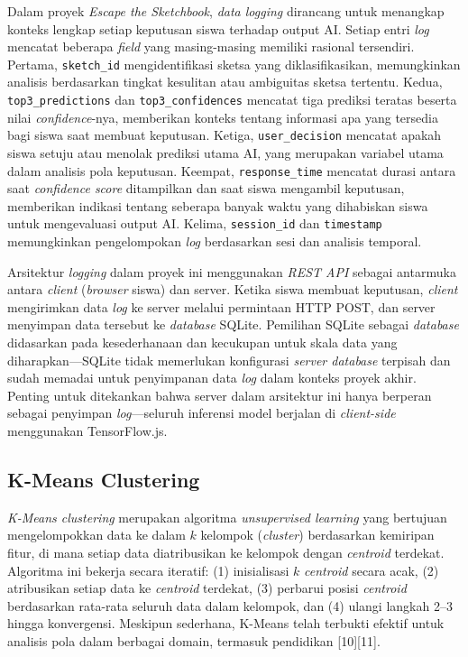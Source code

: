 \documentclass[10pt,twoside,openright]{report}
\begin{document}
Dalam proyek \textit{Escape the Sketchbook}, \textit{data logging} dirancang untuk menangkap konteks lengkap setiap keputusan siswa terhadap output AI. Setiap entri \textit{log} mencatat beberapa \textit{field} yang masing-masing memiliki rasional tersendiri. Pertama, \texttt{sketch\_id} mengidentifikasi sketsa yang diklasifikasikan, memungkinkan analisis berdasarkan tingkat kesulitan atau ambiguitas sketsa tertentu. Kedua, \texttt{top3\_predictions} dan \texttt{top3\_confidences} mencatat tiga prediksi teratas beserta nilai \textit{confidence}-nya, memberikan konteks tentang informasi apa yang tersedia bagi siswa saat membuat keputusan. Ketiga, \texttt{user\_decision} mencatat apakah siswa setuju atau menolak prediksi utama AI, yang merupakan variabel utama dalam analisis pola keputusan. Keempat, \texttt{response\_time} mencatat durasi antara saat \textit{confidence score} ditampilkan dan saat siswa mengambil keputusan, memberikan indikasi tentang seberapa banyak waktu yang dihabiskan siswa untuk mengevaluasi output AI. Kelima, \texttt{session\_id} dan \texttt{timestamp} memungkinkan pengelompokan \textit{log} berdasarkan sesi dan analisis temporal.

Arsitektur \textit{logging} dalam proyek ini menggunakan \textit{REST API} sebagai antarmuka antara \textit{client} (\textit{browser} siswa) dan server. Ketika siswa membuat keputusan, \textit{client} mengirimkan data \textit{log} ke server melalui permintaan HTTP POST, dan server menyimpan data tersebut ke \textit{database} SQLite. Pemilihan SQLite sebagai \textit{database} didasarkan pada kesederhanaan dan kecukupan untuk skala data yang diharapkan—SQLite tidak memerlukan konfigurasi \textit{server database} terpisah dan sudah memadai untuk penyimpanan data \textit{log} dalam konteks proyek akhir. Penting untuk ditekankan bahwa server dalam arsitektur ini hanya berperan sebagai penyimpan \textit{log}—seluruh inferensi model berjalan di \textit{client-side} menggunakan TensorFlow.js.

\subsection{K-Means Clustering}
\label{subsec:kmeans}

\textit{K-Means clustering} merupakan algoritma \textit{unsupervised learning} yang bertujuan mengelompokkan data ke dalam $k$ kelompok (\textit{cluster}) berdasarkan kemiripan fitur, di mana setiap data diatribusikan ke kelompok dengan \textit{centroid} terdekat. Algoritma ini bekerja secara iteratif: (1) inisialisasi $k$ \textit{centroid} secara acak, (2) atribusikan setiap data ke \textit{centroid} terdekat, (3) perbarui posisi \textit{centroid} berdasarkan rata-rata seluruh data dalam kelompok, dan (4) ulangi langkah 2--3 hingga konvergensi. Meskipun sederhana, K-Means telah terbukti efektif untuk analisis pola dalam berbagai domain, termasuk pendidikan [10][11].
\end{document}

